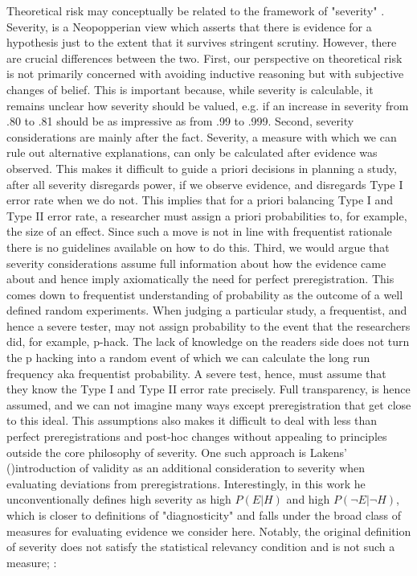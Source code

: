 \documentclass[jou,a4paper]{apa7}
\begin{document}
Theoretical risk may conceptually be related to the framework of "severity" \parencite{mayoStatisticalInferenceSevere2018,mayoErrorStatistics2011}.
Severity, is a Neopopperian view which asserts that there is evidence for a hypothesis just to the extent that it survives stringent scrutiny.
However, there are crucial differences between the two.
First, our perspective on theoretical risk is not primarily concerned with avoiding inductive reasoning but with subjective changes of belief.
This is important because, while severity is calculable, it remains unclear how severity should be valued, e.g. if an increase in severity from .80 to .81 should be as impressive as from .99 to .999.
Second, severity considerations are mainly after the fact.
Severity, a measure with which we can rule out alternative explanations, can only be calculated after evidence was observed.
This makes it difficult to guide a priori decisions in planning a study, after all severity disregards power, if we observe evidence, and disregards Type I error rate when we do not.
This implies that for a priori balancing Type I and Type II error rate, a researcher must assign a priori probabilities to, for example, the size of an effect.
Since such a move is not in line with frequentist rationale there is no guidelines available on how to do this.
Third, we would argue that severity considerations assume full information about how the evidence came about and hence imply axiomatically the need for perfect preregistration.
This comes down to frequentist understanding of probability as the outcome of a well defined random experiments.
When judging a particular study, a frequentist, and hence a severe tester, may not assign probability to the event that the researchers did, for example, p-hack.
The lack of knowledge on the readers side does not turn the p hacking into a random event of which we can calculate the long run frequency aka frequentist probability.
A severe test, hence, must assume that they know the Type I and Type II error rate precisely.
Full transparency, is hence assumed, and we can not imagine many ways except preregistration that get close to this ideal.
This assumptions also makes it difficult to deal with less than perfect preregistrations and post-hoc changes without appealing to principles outside the core philosophy of severity.
One such approach is Lakens' (\citeyear{lakensDeviate2024})introduction of validity as an additional consideration to severity when evaluating deviations from preregistrations.
Interestingly, in this work he unconventionally defines high severity as high $P(E|H)$ and high $P(\neg{}E|\neg{}H)$, which is closer to definitions of "diagnosticity" \parencite{fiedlerWhatConstitutesStrong2017,oberauerAddressingTheoryCrisis2019} and falls under the broad class of measures for evaluating evidence we consider here.
Notably, the original definition of severity does not satisfy the statistical relevancy condition and is not such a measure; \parencite[][, p.14]{mayoStatisticalInferenceSevere2018}:
\end{document}
